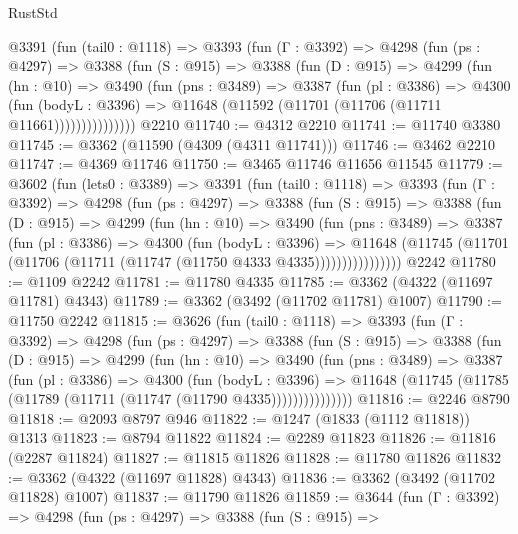 \begin{lexlean}{RustStd}
\begin{coremodule}
      @3391
        (fun (tail0 : @1118) =>
        @3393
          (fun (Γ : @3392) =>
          @4298
            (fun (ps : @4297) =>
            @3388
              (fun (S : @915) =>
              @3388
                (fun (D : @915) =>
                @4299
                  (fun (hn : @10) =>
                  @3490
                    (fun (pns : @3489) =>
                    @3387
                      (fun (pl : @3386) =>
                      @4300
                        (fun (bodyL : @3396) =>
                        @11648 (@11592 (@11701 (@11706 (@11711 @11661)))))))))))))))
    @2210
@11740 := @4312 @2210
@11741 := @11740 @3380
@11745 := @3362 (@11590 (@4309 (@4311 @11741)))
@11746 := @3462 @2210
@11747 := @4369 @11746
@11750 := @3465 @11746 @11656 @11545
@11779 := @3602
    (fun (lets0 : @3389) =>
    @3391
      (fun (tail0 : @1118) =>
      @3393
        (fun (Γ : @3392) =>
        @4298
          (fun (ps : @4297) =>
          @3388
            (fun (S : @915) =>
            @3388
              (fun (D : @915) =>
              @4299
                (fun (hn : @10) =>
                @3490
                  (fun (pns : @3489) =>
                  @3387
                    (fun (pl : @3386) =>
                    @4300
                      (fun (bodyL : @3396) =>
                      @11648
                        (@11745 (@11701 (@11706 (@11711 (@11747 (@11750 @4333 @4335))))))))))))))))
    @2242
@11780 := @1109 @2242
@11781 := @11780 @4335
@11785 := @3362 (@4322 (@11697 @11781) @4343)
@11789 := @3362 (@3492 (@11702 @11781) @1007)
@11790 := @11750 @2242
@11815 := @3626
    (fun (tail0 : @1118) =>
    @3393
      (fun (Γ : @3392) =>
      @4298
        (fun (ps : @4297) =>
        @3388
          (fun (S : @915) =>
          @3388
            (fun (D : @915) =>
            @4299
              (fun (hn : @10) =>
              @3490
                (fun (pns : @3489) =>
                @3387
                  (fun (pl : @3386) =>
                  @4300
                    (fun (bodyL : @3396) =>
                    @11648 (@11745 (@11785 (@11789 (@11711 (@11747 (@11790 @4335)))))))))))))))
@11816 := @2246 @8790
@11818 := @2093 @8797 @946
@11822 := @1247 (@1833 (@1112 @11818)) @1313
@11823 := @8794 @11822
@11824 := @2289 @11823
@11826 := @11816 (@2287 @11824)
@11827 := @11815 @11826
@11828 := @11780 @11826
@11832 := @3362 (@4322 (@11697 @11828) @4343)
@11836 := @3362 (@3492 (@11702 @11828) @1007)
@11837 := @11790 @11826
@11859 := @3644
    (fun (Γ : @3392) =>
    @4298
      (fun (ps : @4297) =>
      @3388
        (fun (S : @915) =>

\end{coremodule}
\end{lexlean}
